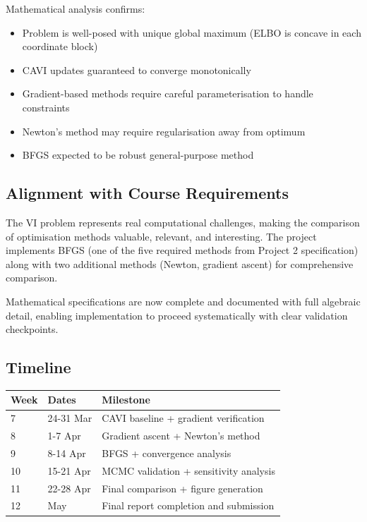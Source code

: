 \documentclass[11pt,a4paper]{article}
\begin{document}
Mathematical analysis confirms:
\begin{itemize}
\item Problem is well-posed with unique global maximum (ELBO is concave in each coordinate block)
\item CAVI updates guaranteed to converge monotonically
\item Gradient-based methods require careful parameterisation to handle constraints
\item Newton's method may require regularisation away from optimum
\item BFGS expected to be robust general-purpose method
\end{itemize}

\subsection*{Alignment with Course Requirements}

The VI problem represents real computational challenges, making the comparison of optimisation methods valuable, relevant, and interesting. The project implements BFGS (one of the five required methods from Project 2 specification) along with two additional methods (Newton, gradient ascent) for comprehensive comparison.

Mathematical specifications are now complete and documented with full algebraic detail, enabling implementation to proceed systematically with clear validation checkpoints.

\subsection*{Timeline}

\begin{center}
\begin{tabular}{|l|l|p{7cm}|}
\hline
\textbf{Week} & \textbf{Dates} & \textbf{Milestone} \\
\hline
7 & 24-31 Mar & CAVI baseline + gradient verification \\
8 & 1-7 Apr & Gradient ascent + Newton's method \\
9 & 8-14 Apr & BFGS + convergence analysis \\
10 & 15-21 Apr & MCMC validation + sensitivity analysis \\
11 & 22-28 Apr & Final comparison + figure generation \\
12 & May & Final report completion and submission \\
\hline
\end{tabular}
\end{center}
\end{document}

